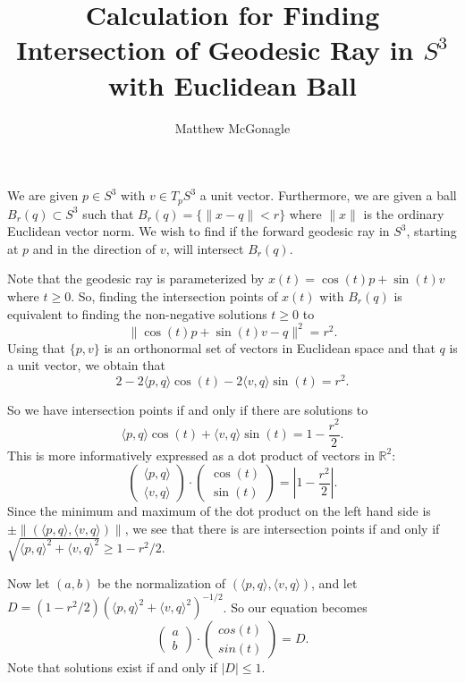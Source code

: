 \documentclass{article}
\title{Calculation for Finding Intersection of Geodesic Ray in \(S^3\) with Euclidean Ball}
\author{Matthew McGonagle}
\begin{document}
\maketitle

    We are given \(p\in S^3\) with \(v \in T_p S^3\) a unit vector. Furthermore, we are given a ball \(B_r(q)\subset S^3\) such that \(B_r(q) = \{\|x - q\|<r\}\) where \(\|x\|\) is the ordinary Euclidean vector norm. We wish to find if the forward geodesic ray in \(S^3\), starting at \(p\) and in the direction of \(v\), will intersect \(B_r(q)\). 

    Note that the geodesic ray is parameterized by \(x(t) = \cos(t) p + \sin(t) v\) where \(t\geq 0\). So, finding the intersection points of \(x(t)\) with \(B_r(q)\) is equivalent to finding the non-negative solutions \(t\geq 0\) to 
\[\|\cos(t) p +\sin(t) v - q\|^2 = r^2.\]
Using that \(\{p,v\}\) is an orthonormal set of vectors in Euclidean space and that \(q\) is a unit vector, we obtain that
\[ 2 - 2\langle p,q \rangle \cos(t) - 2 \langle v, q\rangle \sin(t) = r^2.\]

So we have intersection points if and only if there are solutions to 
\[\langle p,q \rangle \cos(t) + \langle v, q\rangle \sin(t) = 1 - \frac{r^2}{2}. \]
This is more informatively expressed as a dot product of vectors in \(\mathbb R^2\):
\[\begin{pmatrix} \langle p,q\rangle \\ \langle v, q \rangle\end{pmatrix} \cdot \begin{pmatrix} \cos(t) \\ \sin(t) \end{pmatrix} = |1 - \frac{r^2}{2}|. \]
Since the minimum and maximum of the dot product on the left hand side is \(\pm \|(\langle p,q\rangle, \langle v, q\rangle)\|\), we see that there is are intersection points if and only if \(\sqrt{\langle p,q\rangle^2 + \langle v,q\rangle^2} \geq 1 - r^2/2.\)

Now let \((a,b)\) be the normalization of \((\langle p,q\rangle, \langle v, q\rangle)\), and let \(D = (1-r^2/2)(\langle p,q\rangle^2 + \langle v, q\rangle^2)^{-1/2}\). So our equation becomes
\[\begin{pmatrix} a \\ b \end{pmatrix} \cdot \begin{pmatrix} cos(t) \\ sin(t) \end{pmatrix} = D.\] 
Note that solutions exist if and only if \( |D|\leq 1\).
\end{document}
